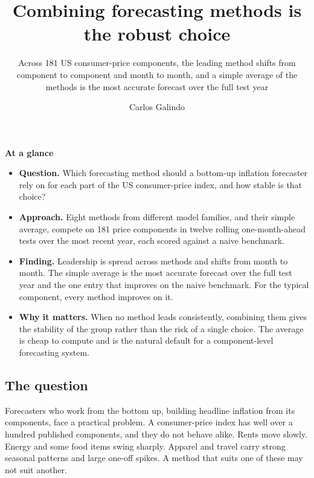 \documentclass[
  british,
  a4paper,
]{article}
\title{Combining forecasting methods is the robust choice}
\subtitle{Across 181 US consumer-price components, the leading method
shifts from component to component and month to month, and a simple
average of the methods is the most accurate forecast over the full test
year}
\author{Carlos Galindo}
\date{}
\providecommand{\tightlist}{%
  \setlength{\itemsep}{0pt}\setlength{\parskip}{0pt}}
\begin{document}
\maketitle


\begin{tcolorbox}[enhanced jigsaw, arc=.35mm, bottomrule=.15mm, breakable, colback=white, colframe=quarto-callout-note-color-frame, left=2mm, leftrule=.75mm, opacityback=0, rightrule=.15mm, toprule=.15mm]

\vspace{-3mm}\textbf{At a glance}\vspace{3mm}

\begin{itemize}
\tightlist
\item
  \textbf{Question.} Which forecasting method should a bottom-up
  inflation forecaster rely on for each part of the US consumer-price
  index, and how stable is that choice?
\item
  \textbf{Approach.} Eight methods from different model families, and
  their simple average, compete on 181 price components in twelve
  rolling one-month-ahead tests over the most recent year, each scored
  against a naive benchmark.
\item
  \textbf{Finding.} Leadership is spread across methods and shifts from
  month to month. The simple average is the most accurate forecast over
  the full test year and the one entry that improves on the naive
  benchmark. For the typical component, every method improves on it.
\item
  \textbf{Why it matters.} When no method leads consistently, combining
  them gives the stability of the group rather than the risk of a single
  choice. The average is cheap to compute and is the natural default for
  a component-level forecasting system.
\end{itemize}

\end{tcolorbox}

\subsection{The question}\label{the-question}

Forecasters who work from the bottom up, building headline inflation
from its components, face a practical problem. A consumer-price index
has well over a hundred published components, and they do not behave
alike. Rents move slowly. Energy and some food items swing sharply.
Apparel and travel carry strong seasonal patterns and large one-off
spikes. A method that suits one of these may not suit another.
\end{document}
